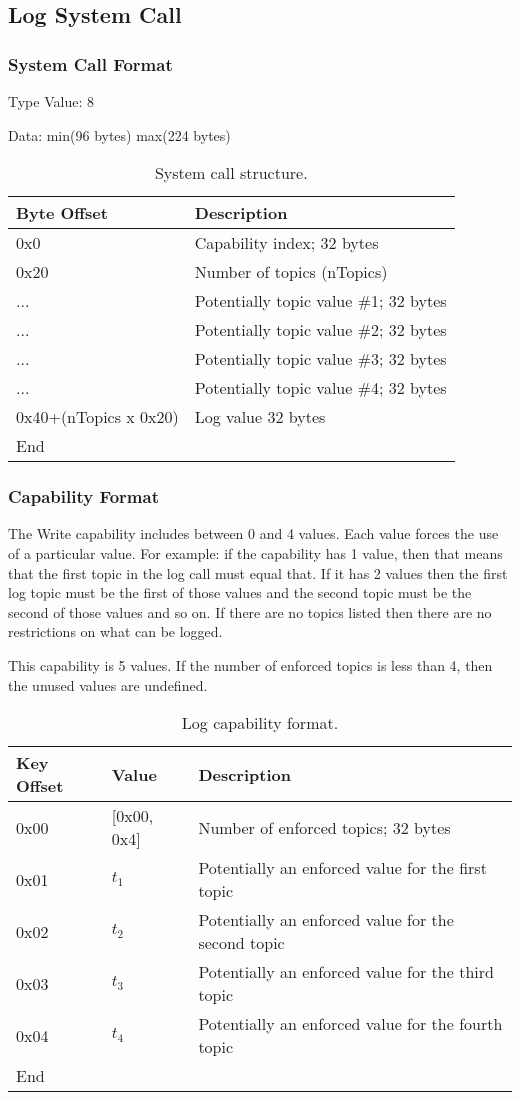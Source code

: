 \documentclass[english,a4paper]{article}
\let\oldparagraph\subsubsection
\renewcommand{\subsubsection}[1]{\oldparagraph{#1}\mbox{}}
\begin{document}
\subsection{Log System Call}

\subsubsection{System Call Format}
Type Value: 8

Data: min(96 bytes) max(224 bytes)

\begin{table}[H]
  \caption{System call structure.}
  \centering{}%
  \begin{tabular}{l|p{}}
    \hline
    Byte Offset & Description\tabularnewline
    \hline
    \hline
    0x0 & Capability index; 32 bytes \tabularnewline
    0x20 & Number of topics (nTopics) \tabularnewline
    ... & Potentially topic value \#1; 32 bytes \tabularnewline
    ... & Potentially topic value \#2; 32 bytes \tabularnewline
    ... & Potentially topic value \#3; 32 bytes \tabularnewline
    ... & Potentially topic value \#4; 32 bytes \tabularnewline
    0x40+(nTopics x 0x20) & Log value 32 bytes \tabularnewline
    \hline
    End &  \tabularnewline
    \hline
  \end{tabular}
\end{table}

\subsubsection{Capability Format}
The Write capability includes between 0 and 4 values. Each value forces the use
of a particular value. For example: if the capability has 1 value, then that
means that the first topic in the log call must equal that. If it has 2 values
then the first log topic must be the first of those values and the second topic
must be the second of those values and so on. If there are no topics listed then
there are no restrictions on what can be logged.

This capability is 5 values. If the number of enforced topics is less than 4,
then the unused values are undefined.

\begin{table}[H]
  \caption{Log capability format.}
  \centering{}%
  \begin{tabular}{l|l|p{}}
    \hline
    Key Offset & Value & Description\tabularnewline
    \hline
    \hline
    0x00 & [0x00, 0x4] & Number of enforced topics; 32 bytes \tabularnewline
    0x01 & $t_1$ & Potentially an enforced value for the first topic
      \tabularnewline
    0x02 & $t_2$ & Potentially an enforced value for the second topic
      \tabularnewline
    0x03 & $t_3$ & Potentially an enforced value for the third topic
      \tabularnewline
    0x04 & $t_4$ & Potentially an enforced value for the fourth topic
      \tabularnewline
    \hline
    End &  \tabularnewline
    \hline
  \end{tabular}
\end{table}
\end{document}
